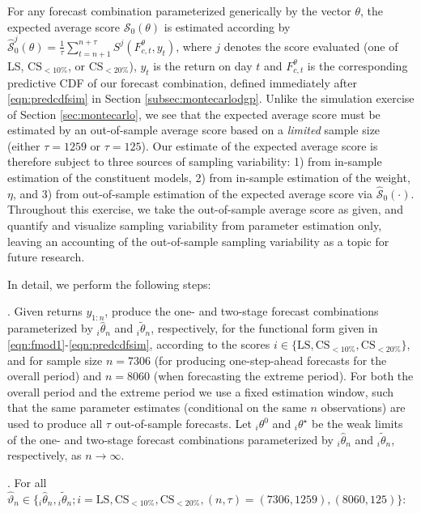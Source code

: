 \documentclass[12pt]{article}
\theoremstyle{definition}
\theoremstyle{remark}
\begin{document}
For any forecast combination parameterized generically by the vector $\theta$, the expected average score $\mathcal{S}_{0}(\theta)$ is estimated according by $\hat{\mathcal{S}}_{0}^{j}(\theta) = \frac{1}{\tau} \sum_{t = n+1}^{n + \tau} S^{j}(F_{c,t}^{\theta}, y_{t})$, where $j$ denotes the score evaluated (one of LS, $\mathrm{CS}_{<10\%}$, or $\mathrm{CS}_{<20\%}$), $y_{t}$ is the return on day $t$ and $F_{c,t}^{\theta}$ is the corresponding predictive CDF of our forecast combination, defined immediately after \eqref{eqn:predcdfsim} in Section \ref{subsec:montecarlodgp}. Unlike the simulation exercise of Section \ref{sec:montecarlo}, we see that the expected average score must be estimated by an out-of-sample average score based on a \textit{limited} sample size (either $\tau =1259$ or $\tau =125$). Our estimate of the expected average score is therefore subject to three sources of sampling variability: 1) from in-sample estimation of the constituent models, 2) from in-sample estimation of the weight, $\eta $, and 3) from out-of-sample estimation of the expected average score via $\hat{\mathcal{S}}_{0}(\cdot)$. Throughout this exercise, we take the out-of-sample average score as given, and quantify and visualize sampling variability from parameter estimation only, leaving an accounting of the out-of-sample sampling variability as a topic for future research.

In detail, we perform the following steps:

\smallskip

. Given returns $y_{1:n}$, produce the one- and two-stage forecast combinations parameterized by ${}_i \hat{\theta}_n$ and ${}_i \tilde{\theta}_n$, respectively, for the functional form given in \eqref{eqn:fmod1}-\eqref{eqn:predcdfsim}, according to the scores $i \in \{\mathrm{LS}, \mathrm{CS}_{<10\%}, \mathrm{CS}_{<20\%}\}$, and for sample size $n = 7306$ (for producing one-step-ahead forecasts for the overall period) and $n = 8060 $ (when forecasting the extreme period). For both the overall period and the extreme period we use a fixed estimation window, such that the same parameter estimates (conditional on the same $n$ observations) are used to produce all $\tau$ out-of-sample forecasts. Let ${}_i \theta^0$ and ${}_i \theta^{\star}$ be the weak limits of the one- and two-stage forecast combinations parameterized by ${}_i \hat{\theta}_n$ and ${}_i \tilde{\theta}_n$, respectively, as $n \to \infty$.

\smallskip

. For all $\hat{\vartheta}_n \in \{ {}_i \hat{\theta}_n, {}_i \tilde{\theta}_n ; i = \mathrm{LS}, \mathrm{CS}_{<10\%}, \mathrm{CS}_{<20\%}, (n, \tau) = (7306, 1259), (8060, 125)\}$:
\end{document}
